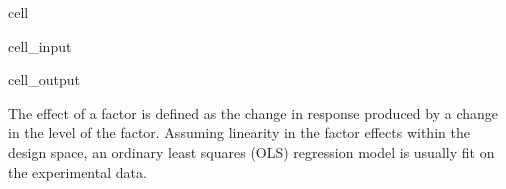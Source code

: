 \documentclass[letterpaper,10pt,english]{jupyterBook}
\begin{document}
\begin{sphinxuseclass}{cell}
\begin{sphinxVerbatimInput}
\begin{sphinxuseclass}{cell_input}
\begin{sphinxVerbatim}[commandchars=\\\{\}]
    \PYG{p}{[}\PYG{p}{]}
     \PYG{p}{[}\PYG{p}{]}\PYG{p}{[}\PYG{p}{]} \PYG{p}{[}\PYG{p}{]}\PYG{p}{[}\PYG{p}{]}   
 
 
\end{sphinxVerbatim}

\end{sphinxuseclass}\end{sphinxVerbatimInput}
\begin{sphinxVerbatimOutput}

\begin{sphinxuseclass}{cell_output}
\noindent{}

\end{sphinxuseclass}\end{sphinxVerbatimOutput}

\end{sphinxuseclass}
\sphinxAtStartPar
The effect of a factor is defined as the change in response produced by a change in the level of the factor. Assuming linearity in the factor effects within the design space, an ordinary least squares (OLS) regression model is usually fit on the experimental data.
\end{document}
